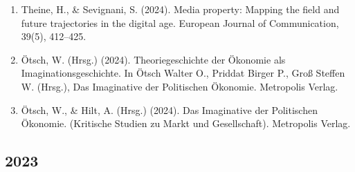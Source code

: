 \begin{enumerate}
	 \item Theine, H., \& Sevignani, S. (2024). Media property: Mapping the field and future trajectories in the digital age. European Journal of Communication, 39(5), 412–425.
	 \item Ötsch, W. (Hrsg.) (2024). Theoriegeschichte der Ökonomie als Imaginationsgeschichte. In Ötsch Walter O., Priddat Birger P., Groß Steffen W. (Hrsg.), Das Imaginative der Politischen Ökonomie. Metropolis Verlag.
	 \item Ötsch, W., \& Hilt, A. (Hrsg.) (2024). Das Imaginative der Politischen Ökonomie. (Kritische Studien zu Markt und Gesellschaft). Metropolis Verlag.
\end{enumerate}
\subsection*{2023}

